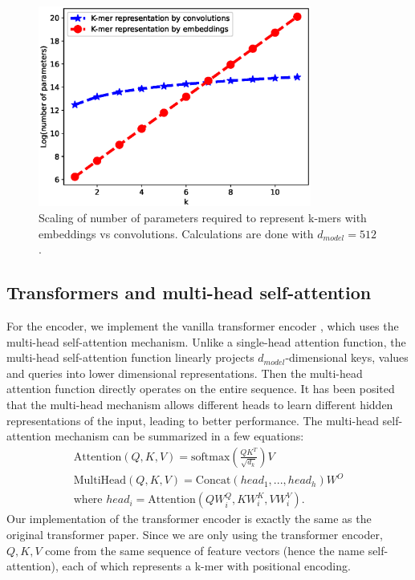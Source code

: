 \documentclass{article}
\begin{document}
\begin{figure}[H]
\center
\includegraphics[width=0.8\textwidth]{kmer_parameter_complexity.eps}
%
\caption{Scaling of number of parameters required to represent k-mers with embeddings vs convolutions. Calculations are done with $d_{model}=512$.}
\label{fig:kmer parameters}
\end{figure}
 



\subsection{Transformers and multi-head self-attention}
For the encoder, we implement the vanilla transformer encoder \cite{transformer_paper}, which uses the multi-head self-attention mechanism. Unlike a single-head attention function, the multi-head self-attention function linearly projects $d_{model}$-dimensional keys, values and queries into lower dimensional representations. Then the multi-head attention function directly operates on the entire sequence. It has been posited that the multi-head mechanism allows different heads to learn different hidden representations of the input, leading to better performance. The multi-head self-attention mechanism can be summarized in a few equations:
\begin{align}
\text{Attention}(Q,K,V)=\text{softmax}(\frac{QK^T}{\sqrt{d_k}})V \\
\text{MultiHead}(Q,K,V)=\text{Concat}(head_1,...,head_h)W^O \\
\text{where $head_i$}=\text{Attention}(QW^Q_i,KW^K_i,VW^V_i).
\end{align}
Our implementation of the transformer encoder is exactly the same as the original transformer paper. Since we are only using the transformer encoder, $Q,K,V$ come from the same sequence of feature vectors (hence the name self-attention), each of which represents a k-mer with positional encoding. 
\end{document}
